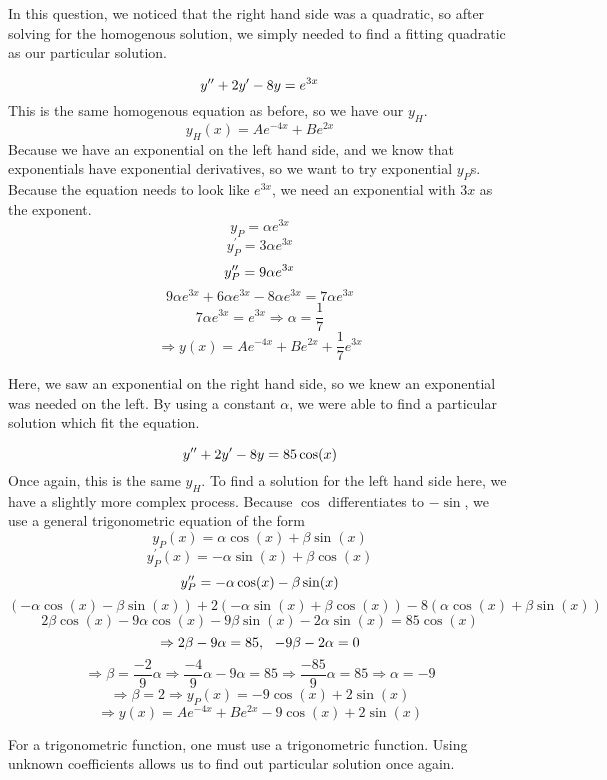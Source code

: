 \documentclass[12pt]{report}
\begin{document}
\begin{flushleft}
In this question, we noticed that the right hand side was a quadratic, so after
solving for the homogenous solution, we simply needed to find a fitting
quadratic as our particular solution.

\begin{center}
    \[y^{\prime\prime} + 2y^\prime - 8y = e^{3x}\]
    This is the same homogenous equation as before, so we have our \(y_H\).
    \[y_H(x) = Ae^{-4x} + Be^{2x}\]
    Because we have an exponential on the left hand side, and we know that
    exponentials have exponential derivatives, so we want to try exponential
    \(y_P\)s. Because the equation needs to look like \(e^{3x}\), we need an
    exponential with \(3x\) as the exponent.
    \[y_P = \alpha e^{3x}\]
    \[y_P^\prime = 3\alpha e^{3x}\]
    \[y_P^{\prime\prime} = 9\alpha e^{3x}\]
    \[9\alpha e^{3x} + 6\alpha e^{3x} - 8\alpha e^{3x} = 7\alpha e^{3x}\]
    \[7\alpha e^{3x} = e^{3x} \Rightarrow \alpha = \frac{1}{7}\]
    \[\Rightarrow y(x) = Ae^{-4x} + Be^{2x} + \frac{1}{7}e^{3x}\]
\end{center}

Here, we saw an exponential on the right hand side, so we knew an exponential
was needed on the left. By using a constant \(\alpha\), we were able to find a
particular solution which fit the equation.

\begin{center}
    \[y^{\prime\prime} + 2y^\prime - 8y = 85\cos(x)\]
    Once again, this is the same \(y_H\). To find a solution for the left hand
    side here, we have a slightly more complex process. Because \(\cos\)
    differentiates to \(-\sin\), we use a general trigonometric equation of the
    form
    \[y_P(x) = \alpha\cos(x) + \beta\sin(x)\]
    \[y_P^\prime(x) = -\alpha\sin(x) + \beta\cos(x)\]
    \[y_P^{\prime\prime} = -\alpha\cos(x) - \beta\sin(x)\]
    \[(-\alpha\cos(x) - \beta\sin(x)) + 2(-\alpha\sin(x) + \beta\cos(x))
    -  8(\alpha\cos(x) + \beta\sin(x))\]
    \[2\beta\cos(x) - 9\alpha\cos(x) - 9\beta\sin(x) - 2\alpha\sin(x)
    = 85\cos(x)\]
    \[\Rightarrow 2\beta - 9\alpha = 85, \:\:\: -9\beta - 2\alpha = 0\]
    \[\Rightarrow \beta = \frac{-2}{9}\alpha 
    \Rightarrow \frac{-4}{9}\alpha - 9\alpha 
    = 85 \Rightarrow \frac{-85}{9}\alpha = 85 \Rightarrow \alpha = -9\]
    \[\Rightarrow \beta = 2 \Rightarrow y_P(x) = -9\cos(x) + 2\sin(x)\]
    \[\Rightarrow y(x) = Ae^{-4x} + Be^{2x} - 9\cos(x) + 2\sin(x)\]
\end{center}

For a trigonometric function, one must use a trigonometric function. Using
unknown coefficients allows us to find out particular solution once again.


\end{flushleft}
\end{document}
